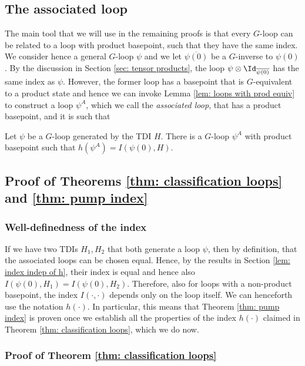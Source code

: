\subsection{The associated loop}
The main tool that we will use in the remaining proofs is that every $G$-loop can be related to a loop with product basepoint, such that they have the same index.
We consider hence a general $G$-loop $\psi$ and we let $\overline{\psi(0)}$ be a $G$-inverse to $\psi(0)$. By the discussion in Section \ref{sec: tensor products}, the loop $\psi\otimes \Id_{\overline{\psi(0)}}$ has the same index as $\psi$. However, the former loop has a basepoint that is $G$-equivalent to a product state and hence we can invoke Lemma \ref{lem: loops with prod equiv} to construct a loop $\psi^A$, which we call the \emph{associated loop}, that has a product basepoint, and it is such that 

\begin{lemma} \label{lem: equivalence associated loop}  
	Let $\psi$ be a $G$-loop generated by the TDI $H$. There is a $G$-loop $\psi^A$ with product basepoint such that
	$
	h(\psi^A)=I(\psi(0),H)
	$.
\end{lemma}

\subsection{Proof of Theorems \ref{thm: classification loops} and \ref{thm: pump index}}


\subsubsection{Well-definedness of the index}

If we have two TDIs $H_1,H_2$ that both generate a loop $\psi$, then by definition, that the associated loops can be chosen equal. Hence, by the results in Section \ref{lem: index indep of h}, their index is equal and hence also 
$ I(\psi(0),H_1)= I(\psi(0),H_2) $. Therefore, also for loops with a non-product basepoint, the index $I(\cdot,\cdot)$ depends only on the loop itself. 
We can henceforth use the notation $h(\cdot)$. In particular, this means that Theorem \ref{thm: pump index} is proven once we establish all the properties of the index $h(\cdot)$ claimed in Theorem \ref{thm: classification loops}, which we do now.




\subsubsection{Proof of Theorem \ref{thm: classification loops}}

